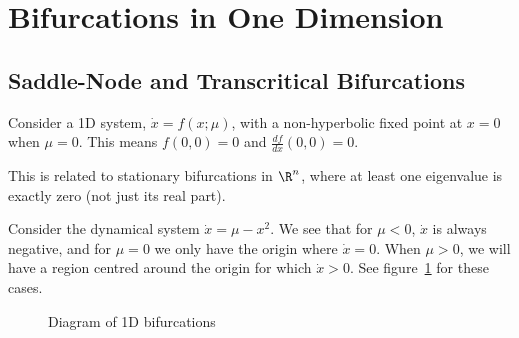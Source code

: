 \documentclass[../Main.tex]{subfiles}
\begin{document}
\section{Bifurcations in One Dimension}
\subsection{Saddle-Node and Transcritical Bifurcations}
Consider a 1D system, $\dot{x} = f(x; \mu)$, with a non-hyperbolic fixed point at $x = 0$ when $\mu = 0$. This means $f(0, 0) = 0$ and $\frac{df}{dx}(0, 0) = 0$.

This is related to stationary bifurcations in $\R^n$, where at least one eigenvalue is exactly zero (not just its real part).
\begin{example}
    Consider the dynamical system $\dot{x} = \mu - x^2$. We see that for $\mu < 0$, $\dot{x}$ is always negative, and for $\mu = 0$ we only have the origin where $\dot{x} = 0$. When $\mu > 0$, we will have a region centred around the origin for which $\dot{x} > 0$. See figure~\ref{figOneDBifs} for these cases.
\end{example}
\begin{figure}
    \centering
    \caption{Diagram of 1D bifurcations}
    \label{figOneDBifs}
\end{figure}
\end{document}
